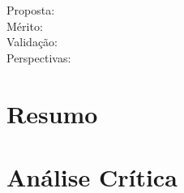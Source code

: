 \documentclass{UnBExam}%
\begin{document}
    \begin{description}
        \item[Proposta:]%

        \item[Mérito:]%

        \item[Validação:]%

        \item[Perspectivas:]%
    \end{description}%

    \section{Resumo}%

    \section{Análise Crítica}%
\end{document}
